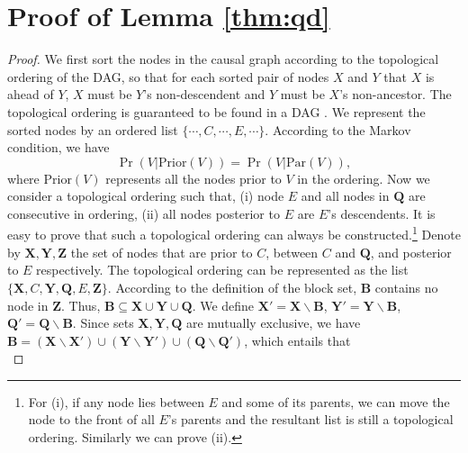 \documentclass[twoside,leqno,twocolumn]{article}
\begin{document}




\appendix
\appendixpage

\section{Proof of Lemma \ref{thm:qd}}\label{sec:thm:qd}
\begin{proof}
We first sort the nodes in the causal graph according to the topological ordering of the DAG, so that for each sorted pair of nodes $X$ and $Y$ that $X$ is ahead of $Y$, $X$ must be $Y$'s non-descendent and $Y$ must be $X$'s non-ancestor. The topological ordering is guaranteed to be found in a DAG \cite{cormen2009introduction}. We represent the sorted nodes by an ordered list $\{\cdots,C,\cdots,E,\cdots\}$. According to the Markov condition, we have
\begin{equation}\label{eq:qd1}
\Pr(V|\mathrm{Prior}(V))=\Pr(V|\mathrm{Par}(V)),
\end{equation}
where $\mathrm{Prior}(V)$ represents all the nodes prior to $V$ in the ordering. Now we consider a topological ordering such that, (i) node $E$ and all nodes in $\mathbf{Q}$ are consecutive in ordering, (ii) all nodes posterior to $E$ are $E$'s descendents. It is easy to prove that such a topological ordering can always be constructed.\footnote{For (i), if any node lies between $E$ and some of its parents, we can move the node to the front of all $E$'s parents and the resultant list is still a topological ordering. Similarly we can prove (ii).} Denote by $\mathbf{X},\mathbf{Y},\mathbf{Z}$ the set of nodes that are prior to $C$, between $C$ and $\mathbf{Q}$, and posterior to $E$ respectively. The topological ordering can be represented as the list $\{\mathbf{X},C,\mathbf{Y},\mathbf{Q},E,\mathbf{Z}\}$. According to the definition of the block set, $\mathbf{B}$ contains no node in $\mathbf{Z}$. Thus, $\mathbf{B}\subseteq \mathbf{X}\cup \mathbf{Y}\cup \mathbf{Q}$. We define $\mathbf{X'}=\mathbf{X}\backslash \mathbf{B}$, $\mathbf{Y'}=\mathbf{Y}\backslash \mathbf{B}$, $\mathbf{Q'}=\mathbf{Q}\backslash \mathbf{B}$. Since sets $\mathbf{X},\mathbf{Y},\mathbf{Q}$ are mutually exclusive, we have $\mathbf{B}=(\mathbf{X}\backslash \mathbf{X'})\cup (\mathbf{Y}\backslash \mathbf{Y'})\cup (\mathbf{Q}\backslash \mathbf{Q'})$, which entails that
\begin{equation}\label{eq:qd2}

\end{equation}
\end{proof}
\end{document}

